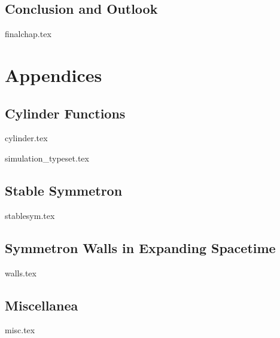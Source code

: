 \documentclass[UKenglish]{texmex/uiomasterthesis}
\begin{document}

\chapter{Conclusion and Outlook}
    {{finalchap.tex}}

















\backmatter{}






\part*{Appendices}

\appendix



\chapter{Cylinder Functions}\label{app:cylinder}
    {{cylinder.tex}}


{{simulation_typeset.tex}
\chapter{Stable Symmetron}\label{app:stablesym}
    {{stablesym.tex}}

\chapter{Symmetron Walls in Expanding Spacetime}\label{app:walls}
    {{walls.tex}}


\chapter{Miscellanea}\label{app:misc}
    {{misc.tex}}
}
\end{document}
